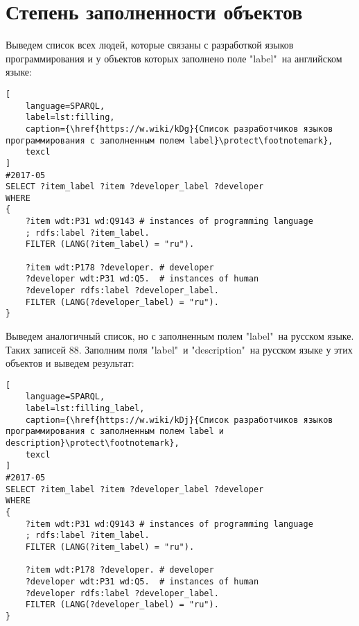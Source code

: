 \section{Степень заполненности объектов}

\label{question:prog_lang_3}

Выведем список всех людей, которые связаны с разработкой языков программирования и у объектов которых заполнено поле "label"\  на английском языке:

\begin{lstlisting}[
	language=SPARQL,
	label=lst:filling,
	caption={\href{https://w.wiki/kDg}{Список разработчиков языков программирования с заполненным полем label}\protect\footnotemark},
	texcl
]
#2017-05
SELECT ?item_label ?item ?developer_label ?developer
WHERE
{
    ?item wdt:P31 wd:Q9143 # instances of programming language
    ; rdfs:label ?item_label. 
    FILTER (LANG(?item_label) = "ru"). 

    ?item wdt:P178 ?developer. # developer 
    ?developer wdt:P31 wd:Q5.  # instances of human
    ?developer rdfs:label ?developer_label. 
    FILTER (LANG(?developer_label) = "ru").  
}
\end{lstlisting}
Выведем аналогичный список, но с заполненным полем "label"\  на русском языке. Таких записей 88. Заполним поля "label"\  и "description"\  на русском языке у этих объектов и выведем результат:

\begin{lstlisting}[
	language=SPARQL,
	label=lst:filling_label,
	caption={\href{https://w.wiki/kDj}{Список разработчиков языков программирования с заполненным полем label и description}\protect\footnotemark},
	texcl
]
#2017-05
SELECT ?item_label ?item ?developer_label ?developer
WHERE
{
    ?item wdt:P31 wd:Q9143 # instances of programming language
    ; rdfs:label ?item_label. 
    FILTER (LANG(?item_label) = "ru"). 

    ?item wdt:P178 ?developer. # developer 
    ?developer wdt:P31 wd:Q5.  # instances of human
    ?developer rdfs:label ?developer_label. 
    FILTER (LANG(?developer_label) = "ru").  
}
\end{lstlisting}

